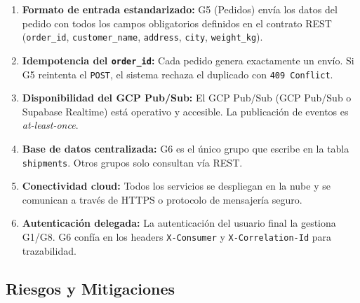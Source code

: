 \documentclass[11pt, a4paper]{article}
\begin{document}
\begin{enumerate}[noitemsep]
  \item \textbf{Formato de entrada estandarizado:} G5 (Pedidos) envía los datos del pedido con todos los campos obligatorios definidos en el contrato REST (\texttt{order\_id}, \texttt{customer\_name}, \texttt{address}, \texttt{city}, \texttt{weight\_kg}).
  \item \textbf{Idempotencia del \texttt{order\_id}:} Cada pedido genera exactamente un envío. Si G5 reintenta el \texttt{POST}, el sistema rechaza el duplicado con \texttt{409 Conflict}.
  \item \textbf{Disponibilidad del GCP Pub/Sub:} El GCP Pub/Sub (GCP Pub/Sub o Supabase Realtime) está operativo y accesible. La publicación de eventos es \emph{at-least-once}.
  \item \textbf{Base de datos centralizada:} G6 es el único grupo que escribe en la tabla \texttt{shipments}. Otros grupos solo consultan vía REST.
  \item \textbf{Conectividad cloud:} Todos los servicios se despliegan en la nube y se comunican a través de HTTPS o protocolo de mensajería seguro.
  \item \textbf{Autenticación delegada:} La autenticación del usuario final la gestiona G1/G8. G6 confía en los headers \texttt{X-Consumer} y \texttt{X-Correlation-Id} para trazabilidad.
\end{enumerate}

\subsection{Riesgos y Mitigaciones}
\end{document}
